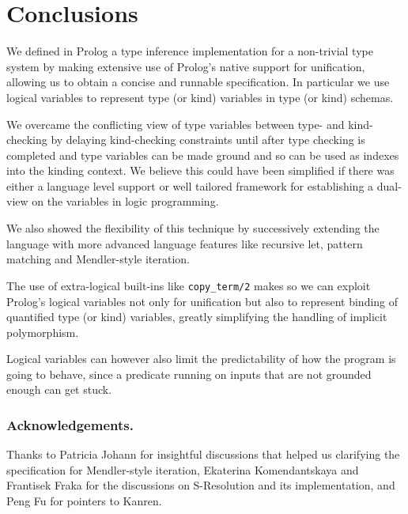 \documentclass[runningheads,a4paper]{llncs}
\begin{document}
\section{Conclusions}\label{sec:concl}

We defined in Prolog a type inference implementation for a non-trivial
type system by making extensive use of Prolog's native support for
unification, allowing us to obtain a concise and runnable
specification. In particular we use logical variables to
represent type (or kind) variables in type (or kind) schemas.

We overcame the conflicting view of type variables between type- and
kind-checking by delaying kind-checking constraints until after
type checking is completed and type variables can be made ground and so
can be used as indexes into the kinding context. We believe this could
have been simplified if there was either a language level support or
well tailored framework for establishing a dual-view on the variables
in logic programming.

We also showed the flexibility of this technique by successively
extending the language with more advanced language features like
recursive let, pattern matching and Mendler-style iteration.

The use of extra-logical built-ins like \verb|copy_term/2| makes so we
can exploit Prolog's logical variables not only for unification but
also to represent binding of quantified type (or kind) variables,
greatly simplifying the handling of implicit polymorphism.

Logical variables can however also limit the predictability of how the
program is going to behave, since a predicate running on inputs that
are not grounded enough can get stuck.

\subsubsection*{Acknowledgements.}
Thanks to Patricia Johann for insightful discussions that helped us clarifying
the specification for Mendler-style iteration, Ekaterina Komendantskaya and
Frantisek Fraka for the discussions on S-Resolution and its implementation,
and Peng Fu for pointers to Kanren.
\makeatletter
\renewcommand\bibsection{\section*\bibname}
\makeatother



\end{document}
